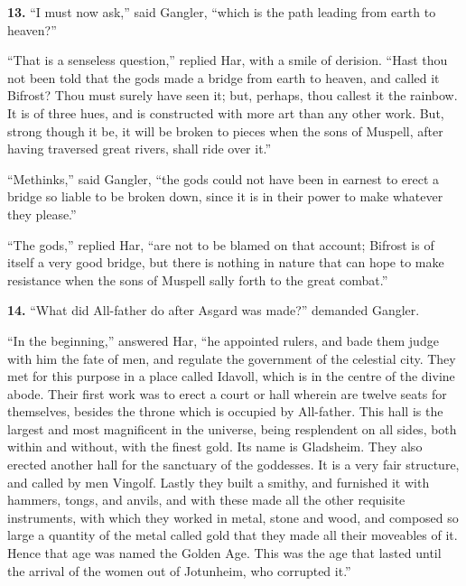 
\textbf{13.} ``I must now ask,'' said Gangler, ``which is the path leading from
earth to heaven?''

``That is a senseless question,'' replied Har, with a smile of derision.
``Hast thou not been told that the gods made a bridge from earth to
heaven, and called it Bifrost? Thou must surely have seen it; but,
perhaps, thou callest it the rainbow. It is of three hues, and is
constructed with more art than any other work. But, strong though it
be, it will be broken to pieces when the sons of Muspell, after having
traversed great rivers, shall ride over it.''

``Methinks,'' said Gangler, ``the gods could not have been in earnest to
erect a bridge so liable to be broken down, since it is in their power
to make whatever they please.''

``The gods,'' replied Har, ``are not to be blamed on that account;
Bifrost is of itself a very good bridge, but there is nothing in
nature that can hope to make resistance when the sons of Muspell sally
forth to the great combat.''


\textbf{14.} ``What did All-father do after Asgard was made?'' demanded
Gangler.

``In the beginning,'' answered Har, ``he appointed rulers, and bade them
judge with him the fate of men, and regulate the government of the
celestial city. They met for this purpose in a place called Idavoll,
which is in the centre of the divine abode. Their first work was to
erect a court or hall wherein are twelve seats for themselves, besides
the throne which is occupied by All-father. This hall is the largest
and most magnificent in the universe, being resplendent on all sides,
both within and without, with the finest gold. Its name is Gladsheim.
They also erected another hall for the sanctuary of the goddesses. It
is a very fair structure, and called by men Vingolf. Lastly they built
a smithy, and furnished it with hammers, tongs, and anvils, and with
these made all the other requisite instruments, with which they worked
in metal, stone and wood, and composed so large a quantity of the
metal called gold that they made all their moveables of it. Hence that
age was named the Golden Age. This was the age that lasted until the
arrival of the women out of Jotunheim, who corrupted it.''


